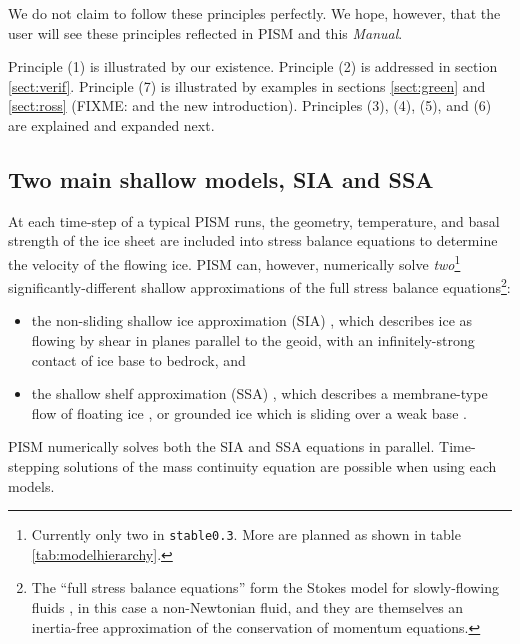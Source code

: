 \documentclass[11pt,final]{amsart}
\begin{document}
\noindent We do not claim to follow these principles perfectly.  We hope, however, that the user will see these principles reflected in PISM and this \emph{Manual}.

Principle (1) is illustrated by our existence.  Principle (2) is addressed in section \ref{sect:verif}.  Principle (7) is illustrated by examples in sections \ref{sect:green} and \ref{sect:ross} (FIXME: and the new introduction).  Principles (3), (4), (5), and (6) are explained and expanded next.


\subsection{Two main shallow models, SIA and SSA}  At each time-step of a typical PISM runs, the geometry, temperature, and basal strength of the ice sheet are included into stress balance equations to determine the velocity of the flowing ice.   PISM can, however, numerically solve \emph{two}\footnote{Currently only two in \texttt{stable0.3}.  More are planned as shown in table \ref{tab:modelhierarchy}.} significantly-different shallow approximations of the full stress balance equations\footnote{The ``full stress balance equations'' form the Stokes model for slowly-flowing fluids \cite{Fowler}, in this case a non-Newtonian fluid, and they are themselves an inertia-free approximation of the conservation of momentum equations.}:\begin{itemize}
\item the non-sliding shallow ice approximation (SIA) \cite{Hutter}, which describes ice as flowing by shear in planes parallel to the geoid, with an infinitely-strong contact of ice base to bedrock, and
\item the shallow shelf approximation (SSA) \cite{WeisGreveHutter}, which describes a membrane-type flow of floating ice \cite{Morland}, or grounded ice which is sliding over a weak base \cite{MacAyeal,SchoofStream}.
\end{itemize}
PISM numerically solves both the SIA and SSA equations in parallel.  Time-stepping solutions of the mass continuity equation are possible when using each models.
\end{document}
